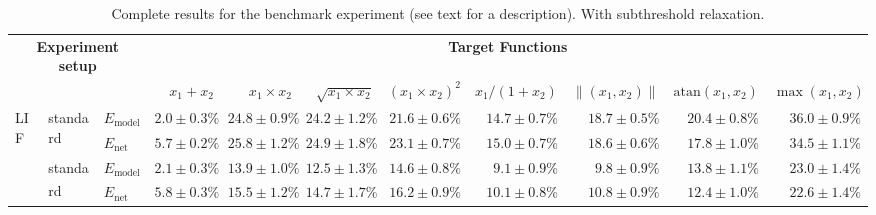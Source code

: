 
\begin{sidewaystable}
	\caption[Complete results for the benchmark experiment]{Complete results for the benchmark experiment (see text for a description). \textsuperscript{\dag}With subthreshold relaxation.}
	\label{tbl:function_approximations_complete}
	\centering
	\sffamily
	\scriptsize
	\begin{tabular}{p{2.2cm} p{1.7cm} l r r r r r r r r }
	\toprule
	\multicolumn{3}{c}{\textbf{Experiment setup}} & \multicolumn{8}{c}{{\textbf{Target Functions}}}\\
	\cmidrule(r){1-3}\cmidrule(l){4-11}
	& & & $x_1 + x_2$ & $x_1 \times x_2$ & $\sqrt{x_1 \times x_2}$ & $(x_1 \times x_2) ^ 2$ & $x_1 / (1 + x_2)$ & $\|(x_1, x_2)\|$ & $\mathrm{atan}(x_1, x_2)$ & $\max(x_1, x_2)$\\
	\midrule
	\multirow{8}{2.2cm}{\raggedleft %
	LIF} &
	\multirow{2}{1.7cm}{\raggedleft standard} &
	$E_\mathrm{model}$ & 
	\color{Gray}$2.0 \pm 0.3\%$ & \color{Gray}$24.8 \pm 0.9\%$ & \color{Gray}$24.2 \pm 1.2\%$ & \color{Gray}$21.6 \pm 0.6\%$ & \color{Gray}$14.7 \pm 0.7\%$ & \color{Gray}$18.7 \pm 0.5\%$ & \color{Gray}$20.4 \pm 0.8\%$ & \color{Gray}$36.0 \pm 0.9\%$
	\\
	& & 
	$E_\mathrm{net}$ &
	\cellcolor{White!75!SteelBlue}$5.7 \pm 0.2\%$ & \cellcolor{White!7!SteelBlue}$25.8 \pm 1.2\%$ & \cellcolor{White!7!SteelBlue}$24.9 \pm 1.8\%$ & \cellcolor{White!7!SteelBlue}$23.1 \pm 0.7\%$ & \cellcolor{White!13!SteelBlue}$15.0 \pm 0.7\%$ & \cellcolor{White!7!SteelBlue}$18.6 \pm 0.6\%$ & \cellcolor{White!7!SteelBlue}$17.8 \pm 1.0\%$ & \cellcolor{White!7!SteelBlue}$34.5 \pm 1.1\%$
	\\\cmidrule(l){2-11}
	&
	\multirow{2}{1.7cm}{\raggedleft standard\textsuperscript{\dag}} &
	$E_\mathrm{model}$ & 
	\color{Gray}$2.1 \pm 0.3\%$ & \color{Gray}$13.9 \pm 1.0\%$ & \color{Gray}$12.5 \pm 1.3\%$ & \color{Gray}$14.6 \pm 0.8\%$ & \color{Gray}$9.1 \pm 0.9\%$ & \color{Gray}$9.8 \pm 0.9\%$ & \color{Gray}$13.8 \pm 1.1\%$ & \color{Gray}$23.0 \pm 1.4\%$
	\\
	& & 
	$E_\mathrm{net}$ &
	\cellcolor{White!69!SteelBlue}$5.8 \pm 0.3\%$ & \cellcolor{White!13!SteelBlue}$15.5 \pm 1.2\%$ & \cellcolor{White!13!SteelBlue}$14.7 \pm 1.7\%$ & \cellcolor{White!19!SteelBlue}$16.2 \pm 0.9\%$ & \cellcolor{White!50!SteelBlue}$10.1 \pm 0.8\%$ & \cellcolor{White!38!SteelBlue}$10.8 \pm 0.9\%$ & \cellcolor{White!25!SteelBlue}$12.4 \pm 1.0\%$ & \cellcolor{White!19!SteelBlue}$22.6 \pm 1.4\%$

\end{tabular}
\end{sidewaystable}
